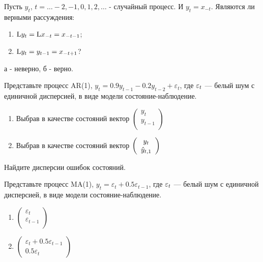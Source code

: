 \begin{problem}
Пусть $y_{t}$, $t=\ldots -2, -1, 0, 1, 2, \ldots$ - случайный процесс. И $y_{t}=x_{-t}$. Являются ли верными рассуждения:
\begin{enumerate}
\item $\mathrm{L} y_{t}=\mathrm{L} x_{-t}=x_{-t-1}$;
\item $\mathrm{L} y_{t}=y_{t-1}=x_{-t+1}$?
\end{enumerate}


\begin{sol}
а - неверно, б - верно.
\end{sol}
\end{problem}






\begin{problem}
Представьте процесс AR(1),
$y_{t}=0.9y_{t-1}-0.2y_{t-2}+\varepsilon_{t}$, где $\varepsilon_t$ —  белый шум с единичной дисперсией,
в виде модели состояние-наблюдение.
\begin{enumerate}
\item  Выбрав в качестве состояний вектор $\left(%
\begin{array}{c}
  y_{t} \\
  y_{t-1} \\
\end{array}%
\right)$ \\
\item Выбрав в качестве состояний вектор $\left(%
\begin{array}{c}
  y_{t} \\
  \hy_{t,1} \\
\end{array}%
\right)$
\end{enumerate}
Найдите дисперсии ошибок состояний.


\begin{sol}
\end{sol}
\end{problem}


\begin{problem}
Представьте процесс MA(1),
$y_{t}=\varepsilon_{t}+0.5\varepsilon_{t-1}$, где $\varepsilon_t$ —   белый шум с единичной дисперсией,
	в виде модели состояние-наблюдение.
\begin{enumerate}
\item $\left(%
\begin{array}{c}
  \varepsilon_{t} \\
  \varepsilon_{t-1} \\
\end{array}%
\right)$ \\
\item $\left(%
\begin{array}{c}
  \varepsilon_{t}+0.5\varepsilon_{t-1} \\
  0.5\varepsilon_{t}
\end{array}%
\right)$
\end{enumerate}


\begin{sol}
\end{sol}
\end{problem}


